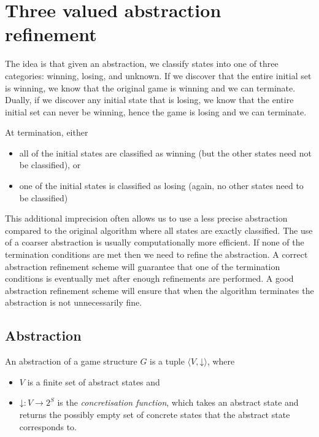 \documentclass[a4paper,twoside,openright,11pt]{book}
\newcommand{\concrete}[1]{#1\mathord{\downarrow}}
\theoremstyle{definition}
\begin{document}
\section{Three valued abstraction refinement}

The idea is that given an abstraction, we classify states into one of three categories: winning, losing, and unknown. If we discover that the entire initial set is winning, we know that the original game is winning and we can terminate. Dually, if we discover any initial state that is losing, we know that the entire initial set can never be winning, hence the game is losing and we can terminate. 

At termination, either 
\begin{itemize}
\item all of the initial states are classified as winning (but the other states need not be classified), or
\item one of the initial states is classified as losing (again, no other states need to be classified)
\end{itemize}

This additional imprecision often allows us to use a less precise abstraction compared to the original algorithm where all states are exactly classified. The use of a coarser abstraction is usually computationally more efficient. If none of the termination conditions are met then we need to refine the abstraction. A correct abstraction refinement scheme will guarantee that one of the termination conditions is eventually met after enough refinements are performed. A good abstraction refinement scheme will ensure that when the algorithm terminates the abstraction is not unnecessarily fine.

\subsection{Abstraction}

An abstraction of a game structure $G$ is a tuple $\langle V, \concrete{}\rangle$, where 
\begin{itemize}
    \item $V$ is a finite set of abstract states and 
    \item $\concrete{} : V \rightarrow 2^S $ is the \emph{concretisation function}, which takes an abstract state and returns the possibly empty set of concrete states that the abstract state corresponds to.  
\end{itemize}
        
\end{document}
